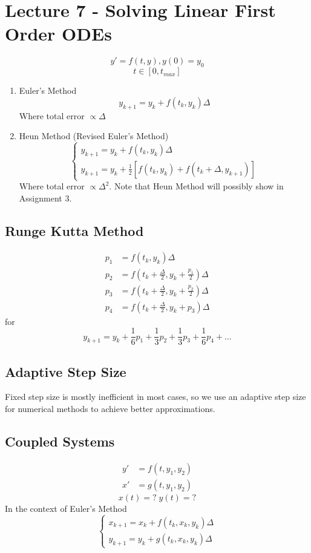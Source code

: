 \documentclass{report}
\theoremstyle{definition}
\theoremstyle{plain}
\theoremstyle{remark}
\begin{document}
\section{Lecture 7 - Solving Linear First Order ODEs}
\[y' = f(t,y), y(0) = y_0\]
\[t \in [0,t_{max}]\]

\begin{enumerate}
      \item Euler's Method
      \[y_{k+1} = y_k + f(t_k, y_k) \Delta\]
      Where total error \( \propto \Delta\)
      \item Heun Method (Revised Euler's Method)
      \[\begin{cases}
            y_{k+1} = y_k + f(t_k, y_k) \Delta \\
            y_{k+1} = y_k + \frac{1}{2} [f(t_k, y_k) + f(t_k + \Delta, y_{k+1})]
      \end{cases}\]
      Where total error \(\propto \Delta^2\). Note that Heun Method will possibly show in
      Assignment 3.
\end{enumerate}
\subsection{Runge Kutta Method}
\begin{align*}
      p_1 &= f(t_k, y_k) \Delta\\
      p_2 &= f(t_k + \frac{\Delta}{2}, y_k + \frac{p_1}{2})\Delta\\
      p_3 &= f(t_k + \frac{\Delta}{2}, y_k + \frac{p_2}{2})\Delta\\
      p_4 &= f(t_k + \frac{\Delta}{2}, y_k + p_3) \Delta
\end{align*}
for \[y_{k+1} = y_k + \frac{1}{6} p_1 + \frac{1}{3} p_2 + \frac{1}{3} p_3 + \frac{1}{6}p_4 + ...\]
\subsection{Adaptive Step Size}
Fixed step size is mostly inefficient in most cases, so we use an adaptive step size
for numerical methods to achieve better approximations.

\subsection{Coupled Systems}
\begin{align*}
      y' &= f(t,y_1, y_2) \\
      x' &= g(t, y_1, y_2) 
\end{align*}
\[x(t) = ? \; y(t) = ?\]
In the context of Euler's Method
\[\begin{cases}
      x_{k+1} = x_k + f(t_k , x_k, y_k)\Delta\\
      y_{k+1} = y_k + g(t_k, x_k, y_k)\Delta
\end{cases}\]
\end{document}
